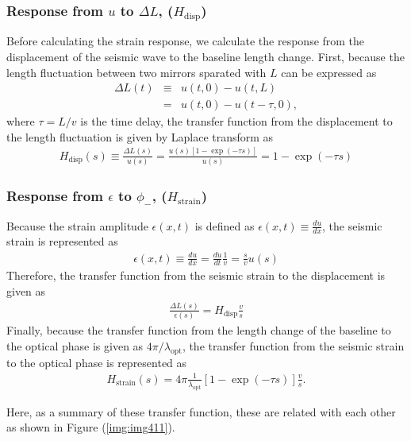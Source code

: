 \subsubsection{Response from $u$ to $\Delta{L}$, ($H_{\mathrm{disp}}$)}
Before calculating the strain response, we calculate the response from the displacement of the seismic wave to the baseline length change. First, because the length fluctuation between two mirrors sparated with $L$ can be expressed as 
\begin{eqnarray} 
  \Delta{L(t)} &\equiv& u(t,0) - u(t,L) \\
  &=& u(t,0) - u(t-\tau,0), \label{eq:eq403}
\end{eqnarray}
where $\tau=L/v$ is the time delay, the transfer function from the displacement to the length fluctuation is given by Laplace transform as
\begin{eqnarray} \label{eq:eq404}
  H_{\mathrm{disp}}(s) \equiv \frac{\Delta{L(s)}}{u(s)} = \frac{u(s)\left[ 1-\exp(-\tau{s}) \right]}{u(s)} = 1 - \exp(-\tau{s})
\end{eqnarray}

\subsubsection{Response from $\epsilon$ to $\phi_{-}$, ($H_{\mathrm{strain}}$)}
Because the strain amplitude $\epsilon{(x,t)}$ is defined as $\epsilon{(x,t)}\equiv\frac{du}{dx}$, the seismic strain is represented as 
\begin{eqnarray} 
  \epsilon{(x,t)} \equiv \frac{du}{dx} = \frac{du}{dt} \frac{1}{v} = \frac{s}{v}u(s) \label{eq:eq406}
\end{eqnarray}
Therefore, the transfer function from the seismic strain to the displacement is given  as
\begin{eqnarray} \label{eq:eq407}
  \frac{\Delta{L(s)}}{\epsilon(s)} = H_{\mathrm{disp}} \frac{v}{s}
\end{eqnarray}
Finally, because the transfer function from the length change of the baseline to the optical phase is given as $4\pi/{\lambda_{\mathrm{opt}}}$, the transfer function from the seismic strain to the optical phase is represented as 
\begin{eqnarray} \label{eq:eq407}
  H_{\mathrm{strain}}(s) = 4\pi\frac{1}{\lambda_{\mathrm{opt}}} \left[1 - \exp(-\tau{s}) \right]\frac{v}{s}.
\end{eqnarray}

Here, as a summary of these transfer function, these are related with each other as shown in Figure (\ref{img:img411}). 

